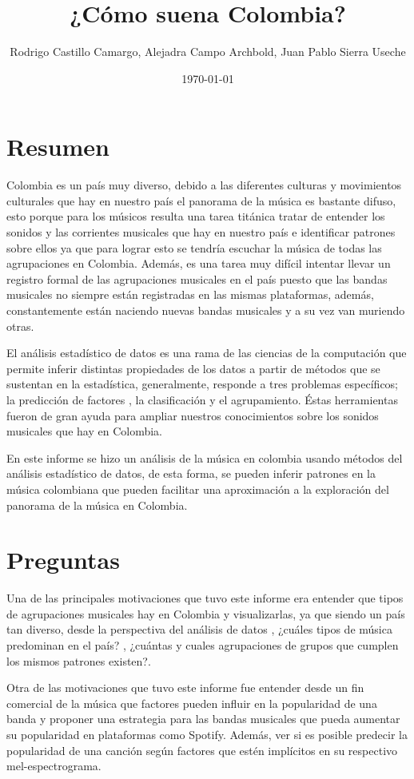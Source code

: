 \documentclass[11pt]{article}
\author{Rodrigo Castillo Camargo, Alejadra Campo Archbold, Juan Pablo Sierra Useche}
\date{\today}
\title{¿Cómo suena Colombia?}
\begin{document}
\maketitle

\section{Resumen}
\label{sec:org3eda03d}
Colombia es un país muy diverso, debido a las diferentes culturas y movimientos
culturales que hay en nuestro país el panorama de la música es bastante difuso,
esto porque para los músicos resulta una tarea titánica tratar de entender los
sonidos y las corrientes musicales que hay en nuestro país e identificar
patrones sobre ellos ya que para lograr esto se tendría escuchar la música de
todas las agrupaciones en Colombia. Además, es una tarea muy difícil intentar
llevar un registro formal de las agrupaciones musicales en el país puesto que
las bandas musicales no siempre están registradas en las mismas plataformas,
además, constantemente están naciendo nuevas bandas musicales y a su vez van
muriendo otras.

El análisis estadístico de datos es una rama de las ciencias de la computación
que permite inferir distintas propiedades de los datos a partir de métodos que
se sustentan en la estadística, generalmente, responde a tres problemas
específicos; la predicción  de factores , la clasificación y el agrupamiento.
Éstas herramientas fueron de gran ayuda para ampliar nuestros conocimientos
sobre los sonidos musicales que hay en Colombia.

En este informe se hizo un análisis de la música en colombia usando métodos del
análisis estadístico de datos, de esta forma, se pueden inferir patrones en la
música colombiana que pueden facilitar una aproximación a la exploración del
panorama de la música en Colombia.

\section{Preguntas}
\label{sec:org3cfbf60}
Una de las principales motivaciones que tuvo este informe era entender que tipos
de agrupaciones musicales hay en Colombia y visualizarlas, ya que siendo un país
tan diverso, desde la perspectiva del análisis de datos , ¿cuáles tipos de
música predominan en el país? , ¿cuántas y cuales agrupaciones de grupos que
cumplen los mismos patrones existen?.

Otra de las motivaciones que tuvo este informe fue entender desde un fin
comercial de la música que factores pueden influir en la popularidad de una
banda y proponer una estrategia para las bandas musicales que pueda aumentar su
popularidad en plataformas como Spotify. Además, ver si es posible predecir la
popularidad de una canción según factores que estén implícitos en su respectivo
mel-espectrograma.
\end{document}
